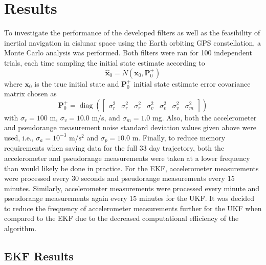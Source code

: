 \documentclass[letterpaper, paper,11pt]{AAS}		%
\begin{document}
\section{Results}
To investigate the performance of the developed filters as well as the feasibility of inertial navigation in cislunar space using the Earth orbiting GPS constellation, a Monte Carlo analysis was performed. Both filters were ran for 100 independent trials, each time sampling the initial state estimate according to
\begin{equation}
	\hat{\mathbf{x}}_0 = N(\mathbf{x}_0, \mathbf{P}_0^+)
\end{equation}
where $\mathbf{x}_0$ is the true initial state and $\mathbf{P}_0^+$ initial state estimate error covariance matrix chosen as
\begin{equation}
	\mathbf{P}_0^+ = \operatorname{diag}(\begin{bmatrix}
		\sigma_r^2 & \sigma_r^2 & \sigma_r^2  & 	\sigma_v^2 & \sigma_v^2 & \sigma_v^2 & \sigma_m^2
	\end{bmatrix})
\end{equation}
with $\sigma_r = 100 $ m, $\sigma_v=10.0$ m/s, and $\sigma_m=1.0$ mg. Also, both the accelerometer and pseudorange measurement noise standard deviation values given above were used, i.e., $\sigma_a = 10^{-3}$ m/$\text{s}^2$ and $\sigma_p=10.0$ m. Finally, to reduce memory requirements when saving data for the full 33 day trajectory, both the accelerometer and pseudorange measurements were taken at a lower frequency than would likely be done in practice. For the EKF, accelerometer measurements were processed every 30 seconds and pseudorange measurements every 15 minutes. Similarly, accelerometer measurements were processed every minute and pseudorange measurements again every 15 minutes for the UKF. It was decided to reduce the frequency of accelerometer measurements further for the UKF when compared to the EKF due to the decreased computational efficiency of the algorithm.

\subsection{EKF Results}
\end{document}
